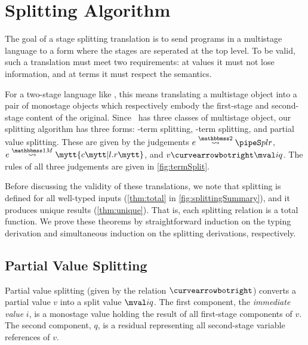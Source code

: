 
\section{Splitting Algorithm}
\label{sec:splitting}



\begin{abstrsyn}

The goal of a stage splitting translation is to send programs in a multistage language
to a form where the stages are seperated at the top level.
To be valid, such a translation must meet two requirements:
at values it must not lose information,
and at terms it must respect the semantics.

For a two-stage language like \lang, this means translating a multistage
object into a pair of monostage objects
which respectively embody the first-stage and second-stage content of the original.
Since \lang\ has three classes of multistage object, 
our splitting algorithm has three forms: 
\bbtwo-term splitting, \bbonem-term splitting, and partial value splitting.
These are given by the judgements $\splittwo e A p l r$, $\splitone e A c {l.r}$, and $v \vsplito \mval i q$.
The rules of all three judgements are given in \ref{fig:termSplit}.

Before discussing the validity of these translations, 
we note that splitting is defined for all well-typed inputs (\ref{thm:total} in \ref{fig:splittingSummary}), and it produces unique results (\ref{thm:unique}).
That is, each splitting relation is a total function.
We prove these theorems by straightforward induction on the typing derivation
and simultaneous induction on the splitting derivations, respectively.

\subsection{Partial Value Splitting}
\label{sec:masking}

Partial value splitting (given by the relation $\vsplito$) converts a 
partial value $v$ into a split value $\mval i q$.
The first component, the \emph{immediate value} $i$, is a monostage value holding
the result of all first-stage components of $v$.  The second
component, $q$, is a residual representing all second-stage
variable references of $v$.


\end{abstrsyn}

